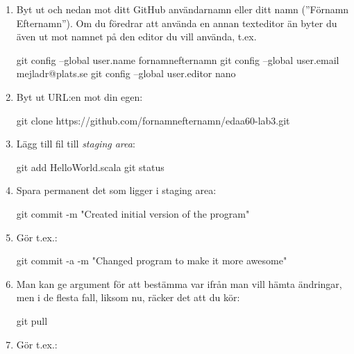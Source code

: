 \begin{enumerate}[label=C\arabic*]
	\item\label{git-config} Byt ut  och  nedan mot ditt GitHub användarnamn eller ditt namn (''Förnamn Efternamn''). Om du föredrar att använda en annan texteditor än  byter du även ut  mot namnet på den editor du vill använda, t.ex. 
	      \begin{Code}
		      git config --global user.name fornamnefternamn
		      git config --global user.email mejladr@plats.se
		      git config --global user.editor nano
	      \end{Code}

	\item\label{git-clone} Byt ut URL:en mot din egen:
	      \begin{Code}
		      git clone https://github.com/fornamnefternamn/edaa60-lab3.git
	      \end{Code}

	\item\label{git-add} Lägg till fil till \emph{staging area}:
	      \begin{Code}
		      git add HelloWorld.scala
		      git status
	      \end{Code}

	\item\label{git-commit} Spara permanent det som ligger i staging area:
	      \begin{Code}
		      git commit -m "Created initial version of the program"
	      \end{Code}

	\item\label{git-commit-a} Gör t.ex.:
	      \begin{Code}
		      git commit -a -m "Changed program to make it more awesome"
	      \end{Code}

	\item\label{git-pull-term} Man kan ge argument för att bestämma var ifrån man vill hämta ändringar, men i de flesta fall, liksom nu, räcker det att du kör:
	      \begin{Code}
		      git pull
	      \end{Code}

	\item\label{git-conflict-1} Gör t.ex.:


\end{enumerate}
